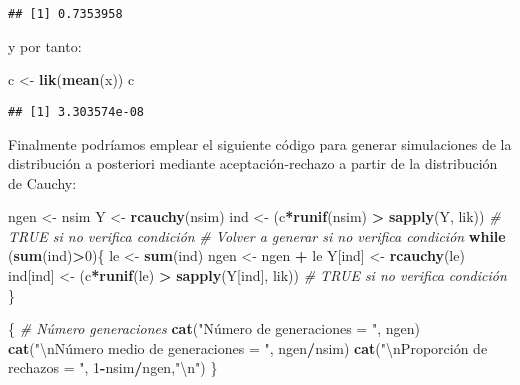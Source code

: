 \documentclass[
]{book}
\newenvironment{Shaded}{\begin{snugshade}}{\end{snugshade}}
\newcommand{\CharTok}[1]{\textcolor[rgb]{0.31,0.60,0.02}{#1}}
\newcommand{\CommentTok}[1]{\textcolor[rgb]{0.56,0.35,0.01}{\textit{#1}}}
\newcommand{\ControlFlowTok}[1]{\textcolor[rgb]{0.13,0.29,0.53}{\textbf{#1}}}
\newcommand{\DecValTok}[1]{\textcolor[rgb]{0.00,0.00,0.81}{#1}}
\newcommand{\KeywordTok}[1]{\textcolor[rgb]{0.13,0.29,0.53}{\textbf{#1}}}
\newcommand{\NormalTok}[1]{#1}
\newcommand{\OperatorTok}[1]{\textcolor[rgb]{0.81,0.36,0.00}{\textbf{#1}}}
\newcommand{\StringTok}[1]{\textcolor[rgb]{0.31,0.60,0.02}{#1}}
\theoremstyle{break}
\theoremstyle{definition}
\theoremstyle{definition}
\theoremstyle{definition}
\theoremstyle{remark}
\begin{document}
\begin{enumerate}
\begin{verbatim}
## [1] 0.7353958
\end{verbatim}

  y por tanto:

\begin{Shaded}
\begin{Highlighting}[]
\NormalTok{c <-}\StringTok{ }\KeywordTok{lik}\NormalTok{(}\KeywordTok{mean}\NormalTok{(x))}
\NormalTok{c    }
\end{Highlighting}
\end{Shaded}

\begin{verbatim}
## [1] 3.303574e-08
\end{verbatim}

  Finalmente podríamos emplear el siguiente código para generar simulaciones de la distribución a posteriori mediante aceptación-rechazo a partir de la distribución de Cauchy:

\begin{Shaded}
\begin{Highlighting}[]
\NormalTok{ngen <-}\StringTok{ }\NormalTok{nsim}
\NormalTok{Y <-}\StringTok{ }\KeywordTok{rcauchy}\NormalTok{(nsim)}
\NormalTok{ind <-}\StringTok{ }\NormalTok{(c}\OperatorTok{*}\KeywordTok{runif}\NormalTok{(nsim) }\OperatorTok{>}\StringTok{ }\KeywordTok{sapply}\NormalTok{(Y, lik)) }\CommentTok{# TRUE si no verifica condición}
\CommentTok{# Volver a generar si no verifica condición}
\ControlFlowTok{while}\NormalTok{ (}\KeywordTok{sum}\NormalTok{(ind)}\OperatorTok{>}\DecValTok{0}\NormalTok{)\{}
\NormalTok{  le <-}\StringTok{ }\KeywordTok{sum}\NormalTok{(ind)}
\NormalTok{  ngen <-}\StringTok{ }\NormalTok{ngen }\OperatorTok{+}\StringTok{ }\NormalTok{le}
\NormalTok{  Y[ind] <-}\StringTok{ }\KeywordTok{rcauchy}\NormalTok{(le)}
\NormalTok{  ind[ind] <-}\StringTok{ }\NormalTok{(c}\OperatorTok{*}\KeywordTok{runif}\NormalTok{(le) }\OperatorTok{>}\StringTok{ }\KeywordTok{sapply}\NormalTok{(Y[ind], lik)) }\CommentTok{# TRUE si no verifica condición}
\NormalTok{\}}

\NormalTok{\{ }\CommentTok{# Número generaciones}
  \KeywordTok{cat}\NormalTok{(}\StringTok{"Número de generaciones = "}\NormalTok{, ngen)}
  \KeywordTok{cat}\NormalTok{(}\StringTok{"}\CharTok{\textbackslash{}n}\StringTok{Número medio de generaciones = "}\NormalTok{, ngen}\OperatorTok{/}\NormalTok{nsim)}
  \KeywordTok{cat}\NormalTok{(}\StringTok{"}\CharTok{\textbackslash{}n}\StringTok{Proporción de rechazos = "}\NormalTok{, }\DecValTok{1}\OperatorTok{-}\NormalTok{nsim}\OperatorTok{/}\NormalTok{ngen,}\StringTok{"}\CharTok{\textbackslash{}n}\StringTok{"}\NormalTok{)}
\NormalTok{\}}
\end{Highlighting}
\end{Shaded}


\end{enumerate}
\end{document}
